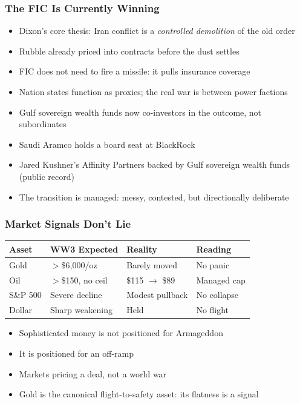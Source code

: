 \begin{frame}[fragile]\frametitle{The FIC Is Currently Winning}
  \begin{itemize}
    \item Dixon's core thesis: Iran conflict is a \emph{controlled demolition} of the old order
    \item Rubble already priced into contracts before the dust settles
    \item FIC does not need to fire a missile: it pulls insurance coverage
    \item Nation states function as proxies; the real war is between power factions
    \item Gulf sovereign wealth funds now co-investors in the outcome, not subordinates
    \item Saudi Aramco holds a board seat at BlackRock
    \item Jared Kushner's Affinity Partners backed by Gulf sovereign wealth funds (public record)
    \item The transition is managed: messy, contested, but directionally deliberate
  \end{itemize}
\end{frame}

\begin{frame}[fragile]\frametitle{Market Signals Don't Lie}
  \begin{center}
  \begin{tabular}{llll}
    \toprule
    \textbf{Asset} & \textbf{WW3 Expected} & \textbf{Reality} & \textbf{Reading} \\
    \midrule
    Gold       & $>$\$6,000/oz      & Barely moved         & No panic \\
    Oil        & $>$\$150, no ceil  & \$115 $\to$ \$89     & Managed cap \\
    S\&P 500   & Severe decline     & Modest pullback      & No collapse \\
    Dollar     & Sharp weakening    & Held                 & No flight \\
    \bottomrule
  \end{tabular}
  \end{center}
  \vspace{0.5em}
  \begin{itemize}
    \item Sophisticated money is not positioned for Armageddon
    \item It is positioned for an off-ramp
    \item Markets pricing a deal, not a world war
    \item Gold is the canonical flight-to-safety asset: its flatness is a signal
  \end{itemize}
\end{frame}

